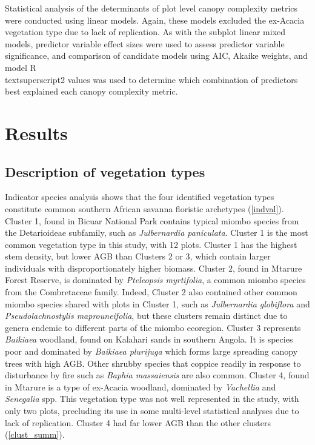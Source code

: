 \documentclass[11pt,a4paper]{article}
\begin{document}
Statistical analysis of the determinants of plot level canopy complexity metrics were conducted using linear models. Again, these models excluded the ex-Acacia vegetation type due to lack of replication. As with the subplot linear mixed models, predictor variable effect sizes were used to assess predictor variable significance, and comparison of candidate models using AIC, Akaike weights, and model R\\textsuperscript{2} values was used to determine which combination of predictors best explained each canopy complexity metric.





\section{Results}

\subsection{Description of vegetation types}

Indicator species analysis shows that the four identified vegetation types constitute common southern African savanna floristic archetypes (\autoref{indval}). Cluster 1, found in Bicuar National Park contains typical miombo species from the Detarioideae subfamily, such as \textit{Julbernardia paniculata}. Cluster 1 is the most common vegetation type in this study, with 12 plots. Cluster 1 has the highest stem density, but lower AGB than Clusters 2 or 3, which contain larger individuals with disproportionately higher biomass. Cluster 2, found in Mtarure Forest Reserve, is dominated by \textit{Pteleopsis myrtifolia}, a common miombo species from the Combretaceae family. Indeed, Cluster 2 also contained other common miombo species shared with plots in Cluster 1, such as \textit{Julbernardia globiflora} and \textit{Pseudolachnostylis maprouneifolia}, but these clusters remain distinct due to genera endemic to different parts of the miombo ecoregion. Cluster 3 represents \textit{Baikiaea} woodland, found on Kalahari sands in southern Angola. It is species poor and dominated by \textit{Baikiaea plurijuga} which forms large spreading canopy trees with high AGB. Other shrubby species that coppice readily in response to disturbance by fire such as \textit{Baphia massaiensis} are also common. Cluster 4, found in Mtarure is a type of ex-Acacia woodland, dominated by \textit{Vachellia} and \textit{Senegalia} spp. This vegetation type was not well represented in the study, with only two plots, precluding its use in some multi-level statistical analyses due to lack of replication. Cluster 4 had far lower AGB than the other clusters (\autoref{clust_summ}). 
\end{document}
